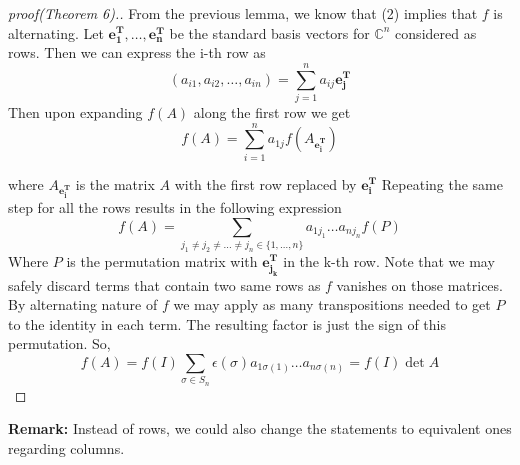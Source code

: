 \documentclass{article}
\begin{document}
\begin{proof}[proof(Theorem 6).] From the previous lemma, we know that (2) implies that $f$ is alternating. 
    Let $\mathbf{e^{T}_1},\dots,\mathbf{e^{T}_n}$ be the standard basis vectors for $\mathbb{C}^n$ considered as rows. Then we can express the i-th row as
    $$(a_{i1},a_{i2},\dots,a_{in})=\sum_{j=1}^{n}a_{ij}\mathbf{e^{T}_j}$$
    Then upon expanding $f(A)$ along the first row we get
    $$f(A)=\sum_{i=1}^{n}a_{1j}f(A_{\mathbf{e^{T}_i}})$$

    where $A_{\mathbf{e^{T}_i}}$ is the matrix $A$ with the first row replaced by $\mathbf{e^{T}_i}$
Repeating the same step for all the rows results in the following expression
$$f(A)=\sum_{j_1\neq j_2\neq\dots \neq j_n\in \{1,\dots,n\}}a_{1j_1}\dots a_{nj_n}f(P)$$
Where $P$ is the permutation matrix with $\mathbf{e^T_{j_k}}$ in the k-th row. Note that we may safely discard terms that contain two same rows as $f$ vanishes on those matrices. By alternating nature of $f$ we may apply as many transpositions needed to get $P$ to the identity in each term. The resulting factor is just the sign of this permutation.
So,
$$f(A)=f(I)\sum_{\sigma\in S_n}\epsilon(\sigma)a_{1\sigma(1)}\dots a_{n\sigma(n)}=f(I)\det{A}$$
\end{proof}
\textbf{Remark:} Instead of rows, we could also change the statements to equivalent ones regarding columns. \\
\end{document}
